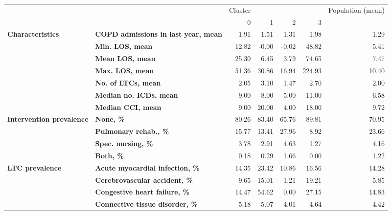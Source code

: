 \begin{tabular}{llrrrrr}
\toprule
               &           & Cluster &         &         &         & Population (mean) \\
               &           &       0 &       1 &       2 &       3 &                   \\
\midrule
\textbf{Characteristics} & \textbf{COPD admissions in last year, mean} &    1.91 &    1.51 &    1.31 &    1.98 &              1.29 \\
               & \textbf{Min. LOS, mean} &   12.82 &   -0.00 &   -0.02 &   48.82 &              5.41 \\
               & \textbf{Mean LOS, mean} &   25.30 &    6.45 &    3.79 &   74.65 &              7.47 \\
               & \textbf{Max. LOS, mean} &   51.36 &   30.86 &   16.94 &  224.93 &             10.40 \\
               & \textbf{No. of LTCs, mean} &    2.05 &    3.10 &    1.47 &    2.70 &              2.00 \\
               & \textbf{Median no. ICDs, mean} &    9.00 &    8.00 &    5.00 &   11.00 &              6.58 \\
               & \textbf{Median CCI, mean} &    9.00 &   20.00 &    4.00 &   18.00 &              9.72 \\
\textbf{Intervention prevalence} & \textbf{None, \%} &   80.26 &   83.40 &   65.76 &   89.81 &             70.95 \\
               & \textbf{Pulmonary rehab., \%} &   15.77 &   13.41 &   27.96 &    8.92 &             23.66 \\
               & \textbf{Spec. nursing, \%} &    3.78 &    2.91 &    4.63 &    1.27 &              4.16 \\
               & \textbf{Both, \%} &    0.18 &    0.29 &    1.66 &    0.00 &              1.22 \\
\textbf{LTC prevalence} & \textbf{Acute myocardial infection, \%} &   14.35 &   23.42 &   10.86 &   16.56 &             14.28 \\
               & \textbf{Cerebrovascular accident, \%} &    9.65 &   15.01 &    1.21 &   19.21 &              5.85 \\
               & \textbf{Congestive heart failure, \%} &   14.47 &   54.62 &    0.00 &   27.15 &             14.83 \\
               & \textbf{Connective tissue disorder, \%} &    5.18 &    5.07 &    4.01 &    4.64 &              4.42 \\

\end{tabular}

